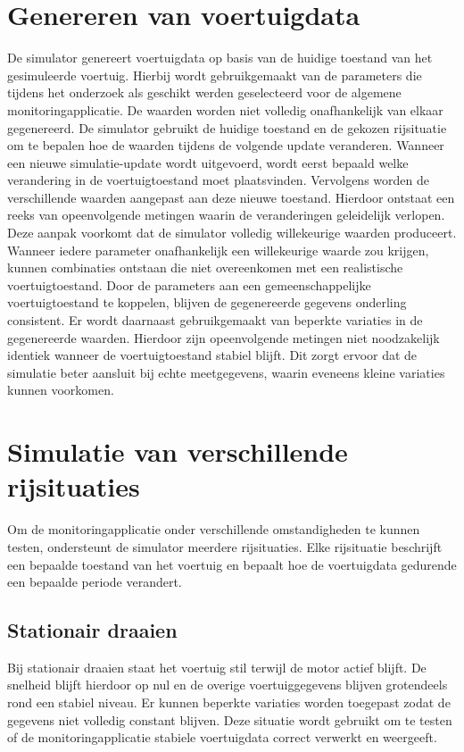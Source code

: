 \section{Genereren van voertuigdata}
De simulator genereert voertuigdata op basis van de huidige toestand van het gesimuleerde voertuig. Hierbij wordt gebruikgemaakt van de parameters die tijdens het onderzoek als geschikt werden geselecteerd voor de algemene monitoringapplicatie.
De waarden worden niet volledig onafhankelijk van elkaar gegenereerd. De simulator gebruikt de huidige toestand en de gekozen rijsituatie om te bepalen hoe de waarden tijdens de volgende update veranderen.
Wanneer een nieuwe simulatie-update wordt uitgevoerd, wordt eerst bepaald welke verandering in de voertuigtoestand moet plaatsvinden. Vervolgens worden de verschillende waarden aangepast aan deze nieuwe toestand. Hierdoor ontstaat een reeks van opeenvolgende metingen waarin de veranderingen geleidelijk verlopen.
Deze aanpak voorkomt dat de simulator volledig willekeurige waarden produceert. Wanneer iedere parameter onafhankelijk een willekeurige waarde zou krijgen, kunnen combinaties ontstaan die niet overeenkomen met een realistische voertuigtoestand. Door de parameters aan een gemeenschappelijke voertuigtoestand te koppelen, blijven de gegenereerde gegevens onderling consistent.
Er wordt daarnaast gebruikgemaakt van beperkte variaties in de gegenereerde waarden. Hierdoor zijn opeenvolgende metingen niet noodzakelijk identiek wanneer de voertuigtoestand stabiel blijft. Dit zorgt ervoor dat de simulatie beter aansluit bij echte meetgegevens, waarin eveneens kleine variaties kunnen voorkomen.

\section{Simulatie van verschillende rijsituaties}
Om de monitoringapplicatie onder verschillende omstandigheden te kunnen testen, ondersteunt de simulator meerdere rijsituaties. Elke rijsituatie beschrijft een bepaalde toestand van het voertuig en bepaalt hoe de voertuigdata gedurende een bepaalde periode verandert.

\subsection{Stationair draaien}
Bij stationair draaien staat het voertuig stil terwijl de motor actief blijft. De snelheid blijft hierdoor op nul en de overige voertuiggegevens blijven grotendeels rond een stabiel niveau.
Er kunnen beperkte variaties worden toegepast zodat de gegevens niet volledig constant blijven. Deze situatie wordt gebruikt om te testen of de monitoringapplicatie stabiele voertuigdata correct verwerkt en weergeeft.

